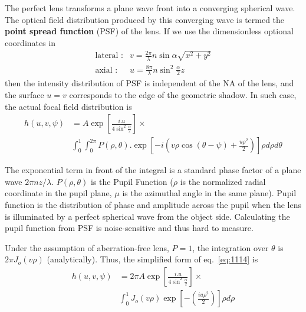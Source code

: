 The perfect lens transforms a plane wave front into a converging
spherical wave. The optical field distribution produced by this
converging wave is termed the {\bf point spread function} (PSF) of
the lens. If we use the dimensionless optional coordinates in
\begin{equation}
  \label{eq:1113}
  \begin{split}
    \text{lateral }: &v = \frac{2\pi}{\lambda}
    n\sin\alpha\sqrt{x^2+y^2} \\
    \text{axial }: &u = \frac{8\pi}{\lambda}n\sin^2\frac{\alpha}{2}z 
  \end{split}
\end{equation}
then the intensity distribution of PSF is independent of the NA of
the lens, and the surface $u=v$ corresponds to the edge of the
geometric shadow. In such case, the actual focal field distribution
is
\begin{equation}
  \label{eq:1114}
  \begin{split}
    h(u,v,\psi) &=
    A\exp\left[\frac{i.u}{4\sin^2\frac{\alpha}{2}}\right]\times\\
    & \int^1_0\int^{2\pi}_0P(\rho, \theta)
    . \exp\left[-i\left(v\rho\cos(\theta-\psi) +
        \frac{u\rho^2}{2}\right)\right] \rho d\rho d\theta
  \end{split}
\end{equation}

The exponential term in front of the integral is a standard phase
factor of a plane wave $2\pi nz/\lambda$. $P(\rho,\theta)$ is the
Pupil Function ($\rho$ is the normalized radial coordinate in the
pupil plane, $\mu$ is the azimuthal angle in the same plane). Pupil
function is the distribution of phase and amplitude across the pupil
when the lens is illuminated by a perfect spherical wave from the
object side. Calculating the pupil function from PSF is
noise-sensitive and thus hard to measure. 

Under the assumption of aberration-free lens, $P=1$, the integration
over $\theta$ is $2\pi J_o(v\rho)$ (analytically). Thus, the
simplified form of eq.~\eqref{eq:1114} is
\begin{equation}
  \label{eq:1115}
  \begin{split}
    h(u,v,\psi) &=
    2\pi A\exp\left[\frac{i.u}{4\sin^2\frac{\alpha}{2}}\right]\times\\
    & \int^1_0 J_o(v\rho)  \exp\left[-\left(
        \frac{iu\rho^2}{2}\right)\right] \rho d\rho 
  \end{split}
\end{equation}


